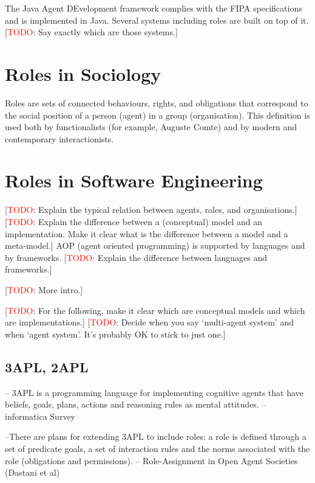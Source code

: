 \documentclass{article}
\newcommand{\todo}[1]{[\textcolor{red}{TODO}: #1]}
\begin{document}
The Java Agent DEvelopment framework complies with the FIPA
specifications and is implemented in Java. Several systems
including roles are built on top of it. \todo{Say exactly which
are those systems.}
\section{Roles in Sociology}

Roles are sets of connected behaviours, rights, and obligations
that correspond to the social position of a person (agent) in a
group (organisation). This definition is used both by functionalists
(for example, Auguste Comte) and by modern and contemporary
interactionists.
\section{Roles in Software Engineering}
\label{sec:software_engineering}

\todo{Explain the typical relation between agents, roles, and
  organisations.}
\todo{Explain the difference between a (conceptual) model and an
  implementation. Make it clear what is the difference between a
  model and a meta-model.}
AOP (agent oriented programming) is supported by languages and by
frameworks.  \todo{Explain the difference between languages and
frameworks.}


\todo{More intro.}

\todo{For the following, make it clear which are conceptual models and
  which are implementations.}
\todo{Decide when you say `multi-agent system' and when `agent system'.
  It's probably OK to stick to just one.}

\subsection{3APL, 2APL}

-- 3APL \cite{books/sp/map2005/DastaniRM05} is a programming language for implementing cognitive agents that have
beliefs, goals, plans, actions and reasoning rules as mental attitudes. --
informatica Survey \cite{journals/informaticaSI/BordiniBDFGLOPR06}

--There are plans for extending 3APL to include roles: a role is defined
through a set of predicate goals, a set of interaction rules and the norms
associated with the role (obligations and permissions). -- Role-Assignment in
Open Agent Societies (Dastani et al) \cite{conf/atal/DastaniDD03}
\end{document}
